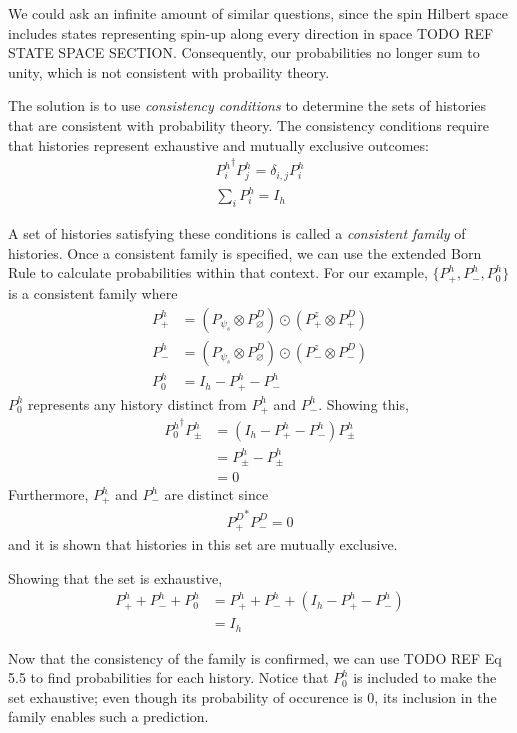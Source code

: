 We could ask an infinite amount of similar questions, since the spin Hilbert space includes states representing spin-up along every direction in space TODO REF STATE SPACE SECTION. Consequently, our probabilities no longer sum to unity, which is not consistent with probaility theory.

The solution is to use \textit{consistency conditions} to determine the sets of histories that are consistent with probability theory. The consistency conditions require that histories represent exhaustive and mutually exclusive outcomes:
\begin{align}
  {P^h_i}^\dagger P^h_j = \delta_{i,j} P^h_i \\
  \sum_i P^h_i = I_h
\end{align}

A set of histories satisfying these conditions is called a \textit{consistent family} of histories. Once a consistent family is specified, we can use the extended Born Rule to calculate probabilities within that context. For our example, $\{P^h_+, P^h_-, P^h_0\}$ is a consistent family where
\begin{align}
    P^h_+ &= \left(P_{\psi_s} \otimes P^D_\varnothing \right) \odot \left(P^z_+ \otimes P^D_+ \right) \\ \nonumber
    P^h_- &= \left(P_{\psi_s} \otimes P^D_\varnothing \right) \odot \left(P^z_- \otimes P^D_- \right) \\ \nonumber
    P^h_0 &= I_h - P^h_+ - P^h_-
\end{align}
$P^h_0$ represents any history distinct from $P^h_+$ and $P^h_-$. Showing this,
\begin{align}
  {P^h_0}^\dagger P^h_\pm &= (I_h - P^h_+ - P^h_-) P^h_\pm \\ \nonumber
  &= P^h_\pm - P^h_\pm \\ \nonumber
  &= 0
\end{align}
Furthermore, $P^h_+$ and $P^h_-$ are distinct since
\begin{align}
  {P^D_+}^*P^D_- = 0
\end{align}
and it is shown that histories in this set are mutually exclusive.

Showing that the set is exhaustive,
\begin{align}
  P^h_+ + P^h_- + P^h_0 &=  P^h_+ + P^h_- + \left(I_h - P^h_+ - P^h_- \right) \\ \nonumber
  &= I_h
\end{align}

Now that the consistency of the family is confirmed, we can use TODO REF Eq 5.5 to find probabilities for each history. Notice that $P^h_0$ is included to make the set exhaustive; even though its probability of occurence is $0$, its inclusion in the family enables such a prediction.

